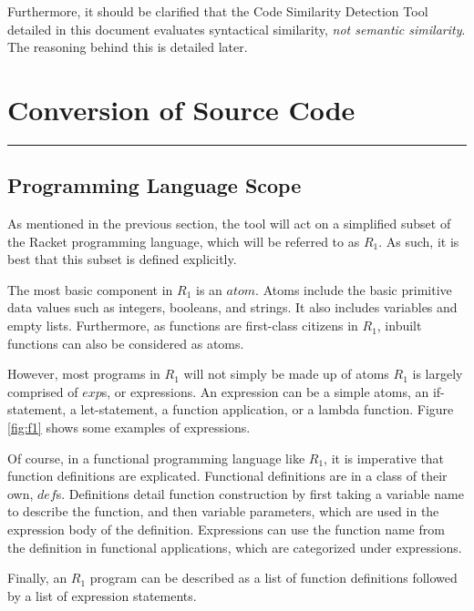 \documentclass[12pt]{article}
\newcommand{\R}{\ensuremath{\mathit{R_{1}}}}
\newcommand{\itm}[1]{\ensuremath{\mathit{#1}}}
\newcommand{\Atm}[0]{\itm{atom}}
\newcommand{\Exp}[0]{\itm{exp}}
\newcommand{\Def}[0]{\itm{def}}
\newcommand{\usection}[1]{\section{#1}\hrule\hfill}
\begin{document}
\hfill

Furthermore, it should be clarified that the Code Similarity Detection Tool detailed in this document evaluates syntactical similarity, \emph{not semantic similarity}. The reasoning behind this is detailed later.

\usection{Conversion of Source Code}

\subsection{Programming Language Scope}

As mentioned in the previous section, the tool will act on a simplified subset of the Racket programming language, which will be referred to as \R{}. As such, it is best that this subset is defined explicitly.

\hfill

The most basic component in \R{} is an \Atm{}. Atoms include the basic primitive data values such as integers, booleans, and strings. It also includes variables and empty lists. Furthermore, as functions are first-class citizens in \R{}, inbuilt functions can also be considered as atoms.

\hfill

However, most programs in \R{} will not simply be made up of atoms \textemdash \R{} is largely comprised of \Exp{}s, or expressions. An expression can be a simple atoms, an if-statement, a let-statement, a function application, or a lambda function. Figure \ref{fig:f1} shows some examples of expressions.

\hfill

Of course, in a functional programming language like \R{}, it is imperative that function definitions are explicated. Functional definitions are in a class of their own, \Def{}s. Definitions detail function construction by first taking a variable name to describe the function, and then variable parameters, which are used in the expression body of the definition. Expressions can use the function name from the definition in functional applications, which are categorized under expressions.

\hfill

Finally, an \R{} program can be described as a list of function definitions followed by a list of expression statements.
\end{document}
